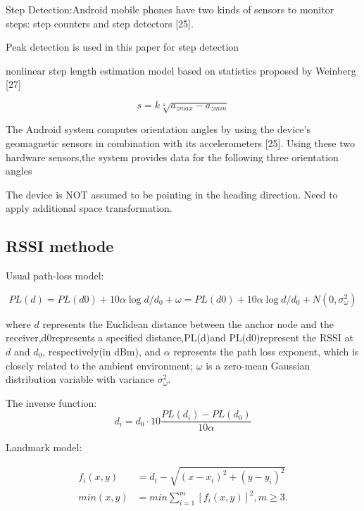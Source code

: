 \documentclass[a4paper, 12pt]{article}
\begin{document}
Step   Detection:Android   mobile   phones   have   two kinds  of  sensors  to  monitor  steps:  step  counters  and  step detectors [25]. 

Peak detection is used in this paper for step detection

nonlinear step length estimation model based on statistics proposed by Weinberg [27]

\begin{equation}
s = k \sqrt[4]{a_{z max} - a_{z min}}
\end{equation}

The Android system computes orientation angles by using the  device’s  geomagnetic  sensors  in  combination  with  its accelerometers   [25].   Using   these   two   hardware   sensors,the  system  provides  data  for  the  following  three  orientation angles

The  device is NOT  assumed to  be pointing in the heading direction. Need to apply additional space transformation.

\subsection{RSSI methode}

Usual path-loss model:

\begin{equation}
PL(d) = PL(d0) + 10 \alpha \log{d / d_0} + \omega = 
PL(d0) + 10 \alpha \log{d / d_0} + N(0, \sigma^2_{\omega})
\end{equation}

where $d$ represents the Euclidean distance between the anchor node  and  the  receiver,d0represents  a  specified  distance,PL(d)and PL(d0)represent the RSSI at $d$ and $d_0$, respectively(in  dBm),  and $\alpha$ represents the  path  loss  exponent, which  is closely related to the ambient environment; $\omega$ is a zero-mean Gaussian distribution variable with variance $\sigma^2_{\omega}$.

The inverse function: 
\begin{equation}
d_i = d_0 \cdot 10 \frac{PL(d_i) - PL(d_0)}{10\alpha}
\end{equation}

Landmark model:

\begin{align}
f_i(x, y) &= d_i - \sqrt{(x - x_i)^2 + (y - y_i)^2} \\
min(x, y) &= min \sum_{i=1}^{m}[f_i(x, y)]^2, m \ge 3.
\end{align}
\end{document}
